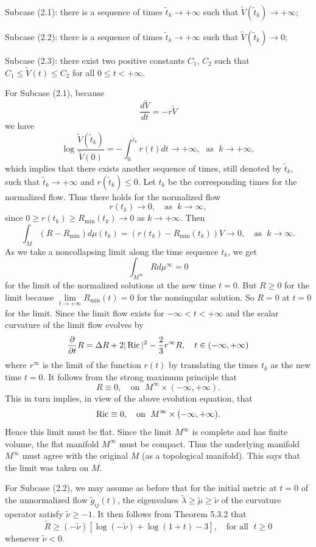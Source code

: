 Subcase (2.1): there is a sequence of times
$\tilde{t}_k\rightarrow+\infty$ such that
$\tilde{V}(\tilde{t}_k)\rightarrow+\infty$;

Subcase (2.2): there is a sequence of times
$\tilde{t}_k\rightarrow+\infty$ such that
$\tilde{V}(\tilde{t}_k)\rightarrow0$;

Subcase (2.3): there exist two positive constants $C_1$, $C_2$
such that $C_1\leq\tilde{V}(t)\leq C_2$ for all $0\leq t<+\infty$.

For Subcase (2.1), because
$$
\frac{d\tilde{V}}{dt}=-r\tilde{V}
$$
we have
$$
\log\frac{\tilde{V}(\tilde{t}_k)}{\tilde{V}(0)}
=-\int_0^{\tilde{t}_k}r(t)dt\rightarrow+\infty,\; \text{ as }\;
k\rightarrow+\infty,
$$
which implies that there exists another sequence of times, still
denoted by $\tilde{t}_k$, such that
$\tilde{t}_k\rightarrow+\infty$ and $r(\tilde{t}_k)\leq0$. Let
$t_k$ be the corresponding times for the normalized flow. Thus
there holds for the normalized flow
$$
r(t_k)\rightarrow0,\quad\text{as }\; k\rightarrow\infty,
$$
since $0\geq r(t_k)\geq R_{\min}(t_k)\rightarrow0$ as
$k\rightarrow+\infty$. Then
$$
\int_M(R-R_{\min})d\mu(t_k)=(r(t_k)-R_{\min}(t_k))V\rightarrow0,
\quad \text{as }\; k\rightarrow\infty.
$$
As we take a noncollapsing limit along the time sequence $t_k$, we
get
$$
\int_{M^\infty}Rd\mu^\infty=0
$$
for the limit of the normalized solutions at the new time $t=0$.
But $R\geq0$ for the limit because
$\lim\limits_{t\rightarrow+\infty}R_{\min}(t)=0$ for the
nonsingular solution. So $R=0$ at $t=0$ for the limit. Since the
limit flow exists for $-\infty<t<+\infty$ and the scalar curvature
of the limit flow evolves by
$$
\frac{\partial}{\partial t}R=\Delta
R+2|\operatorname{Ric}|^2-\frac{2}{3}r^\infty R,\quad t\in(-\infty,+\infty)
$$
where $r^\infty$ is the limit of the function $r(t)$ by
translating the times $t_k$ as the new time $t=0$. It follows from
the strong maximum principle that
$$
R\equiv0, \quad \text{on }\; M^\infty\times(-\infty,+\infty).
$$
This in turn implies, in view of the above evolution equation,
that
$$
\operatorname{Ric}\equiv0, \quad \text{on }\; M^\infty\times(-\infty,+\infty).
$$
Hence this limit must be flat. Since the limit $M^\infty$ is
complete and has finite volume, the flat manifold $M^\infty$ must
be compact. Thus the underlying manifold $M^\infty$ must agree
with the original $M$ (as a topological manifold). This says that
the limit was taken on $M$.

For Subcase (2.2), we may assume as before that for the initial
metric at $t=0$ of the unnormalized flow $\tilde{g}_{ij}(t)$, the
eigenvalues $\tilde{\lambda}\geq\tilde{\mu}\geq\tilde{\nu}$ of the
curvature operator satisfy $\tilde{\nu}\geq-1$. It then follows
from Theorem 5.3.2 that
$$
\tilde{R}\geq(-\tilde{\nu})[\log(-\tilde{\nu})+\log(1+t)-3], \quad
\text{for all }\; t\geq0
$$
whenever $\tilde{\nu}<0$.

